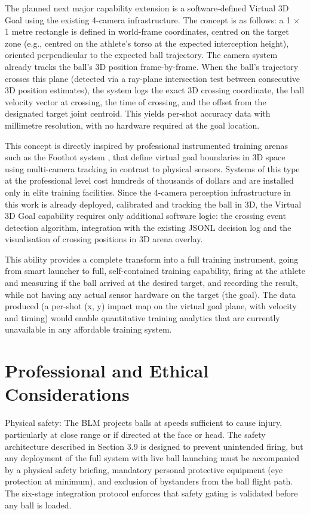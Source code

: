 The planned next major capability extension is a software-defined Virtual 3D Goal using the existing 4-camera infrastructure. The concept is as follows: a 1 \(\times\) 1 metre rectangle is defined in world-frame coordinates, centred on the target zone (e.g., centred on the athlete's torso at the expected interception height), oriented perpendicular to the expected ball trajectory. The camera system already tracks the ball's 3D position frame-by-frame. When the ball's trajectory crosses this plane (detected via a ray-plane intersection test between consecutive 3D position estimates), the system logs the exact 3D crossing coordinate, the ball velocity vector at crossing, the time of crossing, and the offset from the designated target joint centroid. This yields per-shot accuracy data with millimetre resolution, with no hardware required at the goal location.

This concept is directly inspired by professional instrumented training arenas such as the Footbot system \cite{ref35}, that define virtual goal boundaries in 3D space using multi-camera tracking in contrast to physical sensors. Systems of this type at the professional level cost hundreds of thousands of dollars and are installed only in elite training facilities. Since the 4-camera perception infrastructure in this work is already deployed, calibrated and tracking the ball in 3D, the Virtual 3D Goal capability requires only additional software logic: the crossing event detection algorithm, integration with the existing JSONL decision log and the visualisation of crossing positions in 3D arena overlay.

This ability provides a complete transform into a full training instrument, going from smart launcher to full, self-contained training capability, firing at the athlete and measuring if the ball arrived at the desired target, and recording the result, while not having any actual sensor hardware on the target (the goal). The data produced (a per-shot (x, y) impact map on the virtual goal plane, with velocity and timing) would enable quantitative training analytics that are currently unavailable in any affordable training system.

\section{Professional and Ethical Considerations}

Physical safety: The BLM projects balls at speeds sufficient to cause injury, particularly at close range or if directed at the face or head. The safety architecture described in Section 3.9 is designed to prevent unintended firing, but any deployment of the full system with live ball launching must be accompanied by a physical safety briefing, mandatory personal protective equipment (eye protection at minimum), and exclusion of bystanders from the ball flight path. The six-stage integration protocol enforces that safety gating is validated before any ball is loaded.

